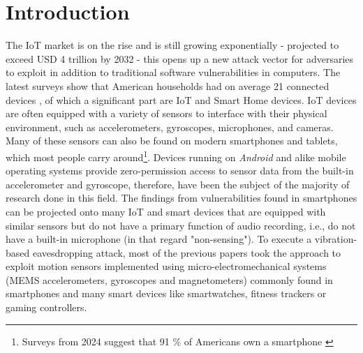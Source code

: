 \documentclass[sigconf, nonacm]{acmart}
\begin{document}



\maketitle

\section{Introduction}
The IoT market is on the rise and is still growing exponentially - projected to exceed USD 4 trillion by 2032 \cite{FortuneBusinessInsights2024} - this opens up a new attack vector for adversaries to exploit in addition to traditional software vulnerabilities in computers.
The latest surveys show that American households had on average 21 connected devices \cite{DeloitteConnectedConsumer2023}, of which a significant part are IoT and Smart Home devices.
IoT devices are often equipped with a variety of sensors to interface with their physical environment, such as accelerometers, gyroscopes, microphones, and cameras.
Many of these sensors can also be found on modern smartphones and tablets, which most people carry around\footnote{Surveys from 2024 suggest that 91 \% of Americans own a smartphone \cite{PewResearchMobileFactSheet2024}}. Devices running on \textit{Android} and alike mobile operating systems provide zero-permission access to sensor data from the built-in accelerometer and gyroscope, therefore, have been the subject of the majority of research done in this field.
The findings from vulnerabilities found in smartphones can be projected onto many IoT and smart devices that are equipped with similar sensors but do not have a primary function of audio recording, i.e., do not have a built-in microphone (in that regard "non-sensing").
To execute a vibration-based eavesdropping attack, most of the previous papers took the approach to exploit motion sensors implemented using micro-electromechanical systems (MEMS accelerometers, gyroscopes and magnetometers) commonly found in smartphones and many smart devices like smartwatches, fitness trackers or gaming controllers.
\end{document}
